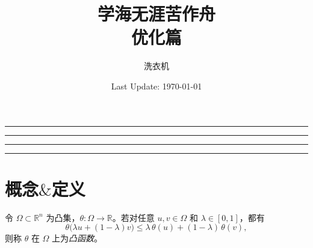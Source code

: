 \newtheorem{que}{问题}[section]
\newtheorem{example}{示例}[section]
\newtheorem{property}{性质}[section]
\newcommand{\alert}[1]{\textcolor{red}{\textbf{#1}}}
\makeatletter
\renewcommand*{\maketitle}{
\begin{titlepage}
\centering
\vspace*{5\baselineskip}

\rule{\textwidth}{1.6pt}\vspace*{-\baselineskip}\vspace*{2pt}
\rule{\textwidth}{0.4pt}

\vspace{0.75\baselineskip}

{\LARGE\bfseries \@title}

\vspace{0.75\baselineskip}

\rule{\textwidth}{0.4pt}\vspace*{-\baselineskip}\vspace{3.2pt}
\rule{\textwidth}{1.6pt}

\vspace{4\baselineskip}

{\Large \@author}

\vspace{0.35\baselineskip}	

{\Large \@date}
\vfill
\end{titlepage}
}
\makeatother
\title{学海无涯苦作舟 \\[20pt]
\Large 优化篇
}
\author{洗衣机}
\date{Last Update: \today}

\maketitle
\clearpage
\tableofcontents  %
\clearpage
{}
\section{概念$\&$定义}
\begin{definition}[凸函数]\label{def:convex}
	令 $\Omega\subset\mathbb R^n$ 为凸集，$\theta:\Omega\to\mathbb R$。若对任意 $u,v\in\Omega$ 和 $\lambda\in[0,1]$，都有
	\[
	\theta\bigl(\lambda u + (1-\lambda) v\bigr)
	\le \lambda\,\theta(u) + (1-\lambda)\,\theta(v),
	\]
	则称 $\theta$ 在 $\Omega$ 上为\emph{凸函数}。
\end{definition}

